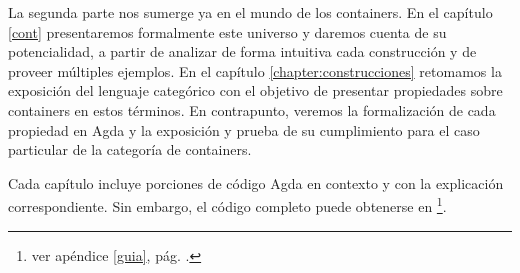 La segunda parte nos sumerge ya en el mundo de los containers. En el capítulo \ref{cont} presentaremos formalmente este universo y daremos cuenta de su potencialidad, a partir de analizar de forma intuitiva cada construcción y de proveer múltiples ejemplos. En el capítulo \ref{chapter:construcciones} retomamos la exposición del lenguaje categórico con el objetivo de presentar propiedades sobre containers en estos términos. En contrapunto, veremos la formalización de cada propiedad en Agda y la exposición y prueba de su cumplimiento para el caso particular de la categoría de containers.

Cada capítulo incluye porciones de código Agda en contexto y con la explicación correspondiente. Sin embargo, el código completo puede obtenerse en \gitcode\footnote{ver apéndice \ref{guia}, pág. \pageref{guia}.}.
